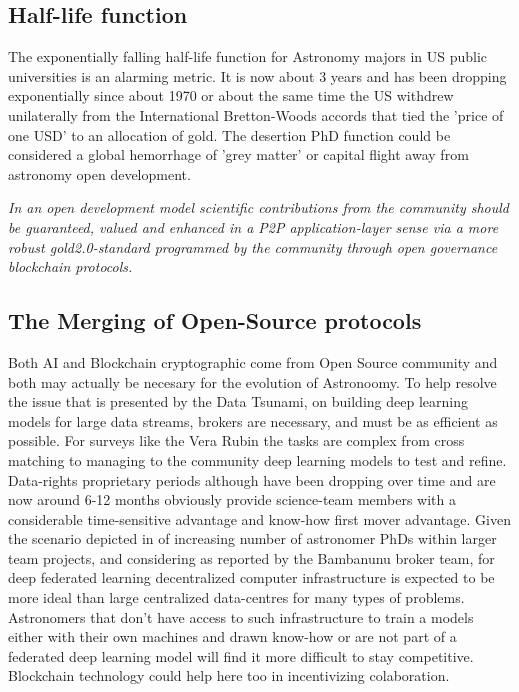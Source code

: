 \documentclass[final,5p,times,twocolumn,authoryear]{elsarticle}
\begin{document}
\subsection{Half-life function}
\label{btc2:sec:sub:half}

The exponentially falling half-life function for Astronomy majors in US public universities is an alarming metric. It is now about 3 years and has been dropping exponentially since about 1970 or about the same time the US withdrew unilaterally from the International Bretton-Woods accords that tied the 'price of one USD' to an allocation of gold. The desertion PhD function could be considered a global hemorrhage of 'grey matter' or capital flight away from astronomy open development.

\emph{In an open development model scientific contributions from the community should be guaranteed, valued and enhanced in a P2P application-layer sense via a more robust gold2.0-standard programmed by the community through open governance blockchain protocols.}


\subsection{The Merging of Open-Source protocols}

Both AI and Blockchain cryptographic come from Open Source community and both may actually be necesary for the evolution of Astronoomy. To help resolve the issue that is presented by the Data Tsunami, on building deep learning models for large data streams, brokers are necessary, and must be as efficient as possible. For surveys like the Vera Rubin the tasks are complex from cross matching to managing to the community deep learning models to test and refine. Data-rights proprietary periods although have been dropping over time and are now around 6-12 months obviously provide science-team members with a considerable time-sensitive advantage and know-how first mover advantage.  Given the scenario depicted in \label{btc2:sec:sub:half} of increasing number of astronomer PhDs within larger team projects, and considering as reported by the Bambanunu broker team, for deep federated learning decentralized computer infrastructure is expected to be more ideal than large centralized data-centres for many types of problems.  Astronomers that don't have access to such infrastructure to train a models either with their own machines and drawn know-how or are not part of a federated deep learning model will find it more difficult to stay competitive. Blockchain technology could help here too in incentivizing colaboration.   
\end{document}
